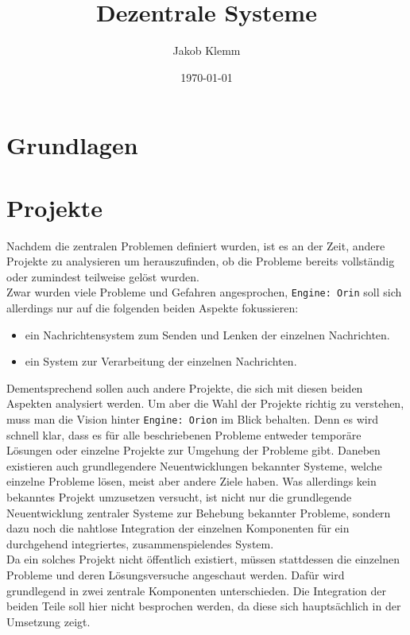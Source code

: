 \documentclass[11pt]{article}
\author{Jakob Klemm}
\date{\today}
\title{Dezentrale Systeme}
\begin{document}
\maketitle
\tableofcontents


\section{Grundlagen}
\label{sec:orge4f2d44}
\section{Projekte}
\label{sec:org1409fc8}
Nachdem die zentralen Problemen definiert wurden, ist es an der Zeit,
andere Projekte zu analysieren um herauszufinden, ob die Probleme
bereits vollständig oder zumindest teilweise gelöst wurden.\\

\noindent Zwar wurden viele Probleme und Gefahren angesprochen,
\texttt{Engine: Orin} soll sich allerdings nur auf die folgenden beiden Aspekte
fokussieren:
\begin{itemize}
\item ein Nachrichtensystem zum Senden und Lenken der einzelnen
Nachrichten.
\item ein System zur Verarbeitung der einzelnen Nachrichten.
\end{itemize}
Dementsprechend sollen auch andere Projekte, die sich mit diesen
beiden Aspekten analysiert werden. Um aber die Wahl der Projekte
richtig zu verstehen, muss man die Vision hinter \texttt{Engine: Orion} im
Blick behalten. Denn es wird schnell klar, dass es für alle
beschriebenen Probleme entweder temporäre Lösungen oder einzelne
Projekte zur Umgehung der Probleme gibt. Daneben existieren auch
grundlegendere Neuentwicklungen bekannter Systeme, welche einzelne
Probleme lösen, meist aber andere Ziele haben. Was allerdings kein
bekanntes Projekt umzusetzen versucht, ist nicht nur die grundlegende
Neuentwicklung zentraler Systeme zur Behebung bekannter Probleme,
sondern dazu noch die nahtlose Integration der einzelnen Komponenten
für ein durchgehend integriertes, zusammenspielendes System.\\

\noindent Da ein solches Projekt nicht öffentlich existiert, müssen
stattdessen die einzelnen Probleme und deren Lösungsversuche
angeschaut werden. Dafür wird grundlegend in zwei zentrale Komponenten
unterschieden. Die Integration der beiden Teile soll hier nicht
besprochen werden, da diese sich hauptsächlich in der Umsetzung zeigt.
\end{document}
